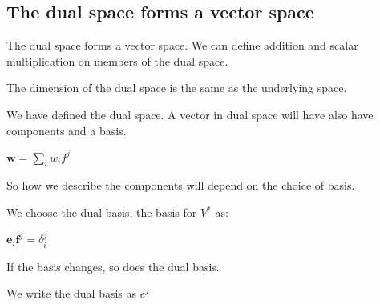 
\subsection{The dual space forms a vector space}

The dual space forms a vector space. We can define addition and scalar multiplication on members of the dual space.

The dimension of the dual space is the same as the underlying space.

We have defined the dual space. A vector in dual space will have also have components and a basis.

\(\mathbf w=\sum_i w_i f^j\)

So how we describe the components will depend on the choice of basis.

We choose the dual basis, the basis for \(V^*\) as:

\(\mathbf e_i \mathbf f^j =\delta_i^j\)

If the basis changes, so does the dual basis.

We write the dual basis as \(e^j\)

